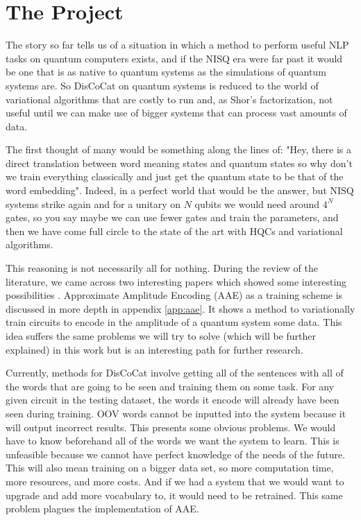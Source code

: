 \chapter{The Project} \label{chap:Problem}

The story so far tells us of a situation in which a method to perform useful NLP tasks on quantum computers exists, and if the NISQ era were far past it would be one that is as native to quantum systems as the simulations of quantum systems are. So DisCoCat on quantum systems is reduced to the world of variational algorithms that are costly to run and, as Shor's factorization, not useful until we can make use of bigger systems that can process vast amounts of data.

The first thought of many would be something along the lines of: "Hey, there is a direct translation between word meaning states and quantum states so why don't we train everything classically and just get the quantum state to be that of the word embedding". Indeed, in a perfect world that would be the answer, but NISQ systems strike again and for a unitary on $N$ qubits we would need around $4^N$ gates, so you say maybe we can use fewer gates and train the parameters, and then we have come full circle to the state of the art with HQCs and variational algorithms.

This reasoning is not necessarily all for nothing. During the review of the literature, we came across two interesting papers which showed some interesting possibilities \cite{nakaji_approximate_2022,mitsuda_approximate_2023}. Approximate Amplitude Encoding (AAE) as a training scheme is discussed in more depth in appendix \ref{app:aae}. It shows a method to variationally train circuits to encode in the amplitude of a quantum system some data. This idea suffers the same problems we will try to solve (which will be further explained) in this work but is an interesting path for further research.

Currently, methods for DisCoCat involve getting all of the sentences with all of the words that are going to be seen and training them on some task. For any given circuit in the testing dataset, the words it encode will already have been seen during training. OOV words cannot be inputted into the system because it will output incorrect results. This presents some obvious problems. We would have to know beforehand all of the words we want the system to learn. This is unfeasible because we cannot have perfect knowledge of the needs of the future. This will also mean training on a bigger data set, so more computation time, more resources, and more costs. And if we had a system that we would want to upgrade and add more vocabulary to, it would need to be retrained. This same problem plagues the implementation of AAE.

